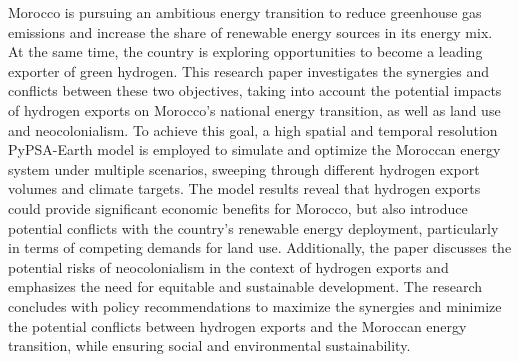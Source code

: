 Morocco is pursuing an ambitious energy transition to reduce greenhouse gas emissions and increase the share of renewable energy sources 
in its energy mix. At the same time, the country is exploring opportunities to become a leading exporter of green hydrogen. 
This research paper investigates the synergies and conflicts between these two objectives, taking into account the potential
impacts of hydrogen exports on Morocco's national energy transition, as well as land use and neocolonialism. To achieve this goal, a 
high spatial and temporal resolution PyPSA-Earth model is employed to simulate and optimize the Moroccan energy system under multiple scenarios,
sweeping through different hydrogen export volumes and climate targets. The model results reveal that hydrogen exports could provide significant
economic benefits for Morocco, but also introduce potential conflicts with the country's renewable energy deployment, particularly in terms of 
competing demands for land use. Additionally, the paper discusses the potential risks of neocolonialism in the context of hydrogen exports and 
emphasizes the need for equitable and sustainable development. The research concludes with policy recommendations to maximize the synergies and 
minimize the potential conflicts between hydrogen exports and the Moroccan energy transition, while ensuring social and environmental sustainability.